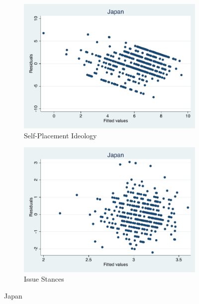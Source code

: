 \documentclass[12pt, titlepage]{article}
\begin{document}
\begin{figure}[H]
	\centering
	\begin{subfigure}[b]{0.475\textwidth}   
		\centering 
		\includegraphics[width=\textwidth]{Residuals/CountryIdeo/Japan}
		\caption{Self-Placement Ideology}
	\end{subfigure}
	\hfill
	\begin{subfigure}[b]{0.475\textwidth}
		\centering 
		\includegraphics[width=\textwidth]{Residuals/CountryLib/Japan}
		\caption{Issue Stances}
	\end{subfigure}
	\caption{Japan}
	\label{Japan}
\end{figure}
\end{document}
